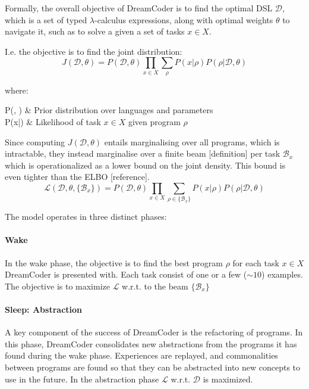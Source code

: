 Formally, the overall objective of DreamCoder is to find the optimal DSL \(\mathcal{D}\), which is a set of typed \(\lambda\)-calculus expressions, along with optimal weights \( \theta \) to navigate it, such as to solve a given a set of tasks \(x \in X\).

I.e. the objective is to find the joint distribution:
\[ 
    J(\mathcal{D}, \theta) = P(\mathcal{D}, \theta) \prod_{x \in X} \sum_{\rho} P(x|\rho)P(\rho|\mathcal{D},\theta) 
\]

where:
\begin{conditions*}
    P(, \theta) & Prior distribution over languages and parameters \\
    P(x|\rho) & Likelihood of task \(x \in X\) given program \(\rho\)
\end{conditions*}

Since computing \( J(\mathcal{D}, \theta) \) entails marginalising over all programs, which is intractable, they instead marginalise over a finite beam [definition] per task \( {\mathcal{B}_x} \) which is operationalized as a lower bound on the joint density. This bound is even tighter than the ELBO [reference].
\[
    \mathcal{L}(\mathcal{D}, \theta, \{\mathcal{B}_x\}) = P(\mathcal{D}, \theta) \prod_{x \in X} \sum_{\rho \in \{\mathcal{B}_x\}} P(x|\rho)P(\rho|\mathcal{D},\theta)
\]

The model operates in three distinct phases:

\paragraph{Wake} In the wake phase, the objective is to find the best program $\rho$ for each task $x \in X$ DreamCoder is presented with. Each task consist of one or a few ($\sim10$) examples.
The objective is to maximize \(\mathcal{L}\) w.r.t. to the beam \(\{\mathcal{B}_x\}\)

\paragraph{Sleep: Abstraction} A key component of the success of DreamCoder is the refactoring of programs. In this phase, DreamCoder consolidates new abstractions from the programs it has found during the wake phase. Experiences are replayed, and commonalities between programs are found so that they can be abstracted into new concepts to use in the future. 
In the abstraction phase \(\mathcal{L}\) w.r.t. \(\mathcal{D}\) is maximized.

